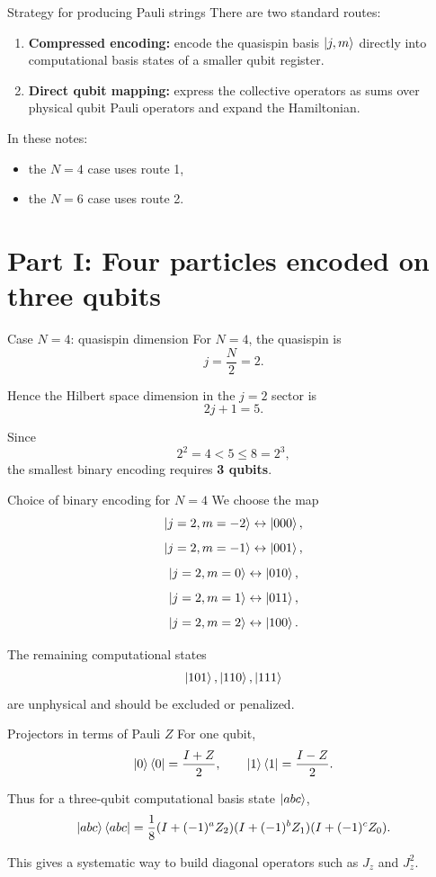 \documentclass[aspectratio=169]{beamer}
\begin{document}
\begin{frame}{Strategy for producing Pauli strings}
There are two standard routes:
\begin{enumerate}
\item \textbf{Compressed encoding:} encode the quasispin basis \(\ket{j,m}\) directly into computational basis states of a smaller qubit register.
\item \textbf{Direct qubit mapping:} express the collective operators as sums over physical qubit Pauli operators and expand the Hamiltonian.
\end{enumerate}

In these notes:
\begin{itemize}
\item the \(N=4\) case uses route 1,
\item the \(N=6\) case uses route 2.
\end{itemize}
\end{frame}

\section{Part I: Four particles encoded on three qubits}

\begin{frame}{Case \(N=4\): quasispin dimension}
For \(N=4\), the quasispin is
\[
j = \frac{N}{2} = 2.
\]

Hence the Hilbert space dimension in the \(j=2\) sector is
\[
2j+1 = 5.
\]

Since
\[
2^2=4 < 5 \le 8 = 2^3,
\]
the smallest binary encoding requires \textbf{3 qubits}.
\end{frame}

\begin{frame}{Choice of binary encoding for \(N=4\)}
We choose the map
\[
\ket{j=2,m=-2} \leftrightarrow \ket{000},
\]
\[
\ket{j=2,m=-1} \leftrightarrow \ket{001},
\]
\[
\ket{j=2,m=0} \leftrightarrow \ket{010},
\]
\[
\ket{j=2,m=1} \leftrightarrow \ket{011},
\]
\[
\ket{j=2,m=2} \leftrightarrow \ket{100}.
\]

The remaining computational states
\[
\ket{101},\ket{110},\ket{111}
\]
are unphysical and should be excluded or penalized.
\end{frame}

\begin{frame}{Projectors in terms of Pauli \(Z\)}
For one qubit,
\[
\ket{0}\bra{0} = \frac{I+Z}{2},
\qquad
\ket{1}\bra{1} = \frac{I-Z}{2}.
\]

Thus for a three-qubit computational basis state \(\ket{abc}\),
\[
\ket{abc}\bra{abc}
=
\frac{1}{8}(I+(-1)^a Z_2)(I+(-1)^b Z_1)(I+(-1)^c Z_0).
\]

This gives a systematic way to build diagonal operators such as \(J_z\) and \(J_z^2\).
\end{frame}
\end{document}
